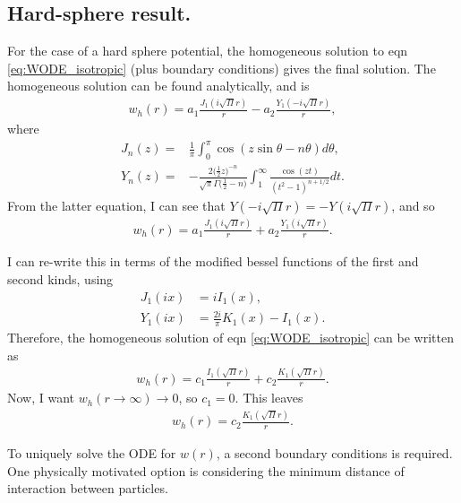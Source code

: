 \documentclass[twocolumn,amsmath,amssymb,aps]{revtex4-1}%
\begin{document}
\subsection{Hard-sphere result.}
For the case of a hard sphere potential, the homogeneous solution to eqn
\ref{eq:WODE_isotropic} (plus boundary conditions) gives the final solution.
The homogeneous solution can be found analytically, and is
\begin{align}
  w_h(r)=a_1\frac{J_1(i\sqrt{\Pi}r)}{r}-a_2\frac{Y_1(-i\sqrt{\Pi}r)}{r},
\end{align}
where
\begin{align}
  J_n(z) =& \frac{1}{\pi}\int_0^{\pi}\cos(z\sin\theta-n\theta)d\theta,\\
  Y_n(z) =& -\frac{2\bigg(\frac{1}{2}z\bigg)^{-n}}{\sqrt{\pi}
    \Gamma\bigg(\frac{1}{2}-n\bigg)}
  \int_1^{\infty}\frac{\cos(zt)}{(t^2-1)^{n+1/2}}dt.
\end{align}
From the latter equation, I can see that $Y(-i\sqrt{\Pi}r)=-Y(i\sqrt{\Pi}r)$,
and so
\begin{align}
  w_h(r)=a_1\frac{J_1(i\sqrt{\Pi}r)}{r}+a_2\frac{Y_1(i\sqrt{\Pi}r)}{r}.
\end{align}

I can re-write this in terms of the modified bessel functions of the first and
second kinds, using
\begin{align}
  J_1(ix) &= i I_1(x),\\
  Y_1(ix) &= \frac{2i}{\pi}K_1(x)-I_1(x).
\end{align}
Therefore, the homogeneous solution of eqn \ref{eq:WODE_isotropic} can be
written as
\begin{align}
  w_h(r) = c_1\frac{I_1(\sqrt{\Pi}r)}{r} + c_2\frac{K_1(\sqrt{\Pi}r)}{r}.
\end{align}
Now, I want $w_h(r\to\infty)\to0$, so $c_1=0$. This leaves
\begin{align}\label{eq:Whomo}
  w_h(r) = c_2\frac{K_1(\sqrt{\Pi}r)}{r}.
\end{align}

To uniquely solve the ODE for $w(r)$, a second boundary conditions is required.
One physically motivated option is considering the minimum distance of
interaction between particles.
\end{document}
